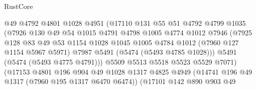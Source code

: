 \begin{lexlean}{RustCore}
\begin{coremodule}
                                @49
                                @4792
                                @4801
                                @1028
                                @4951
                                (@17110
                                  @131
                                  @55
                                  @51
                                  @4792
                                  @4799
                                  @1035
                                  (@7926
                                    @130
                                    @49
                                    @54
                                    @1015
                                    @4791
                                    @4798
                                    @1005
                                    @4774
                                    @1012
                                    @7946
                                    (@7925
                                      @128
                                      @83
                                      @49
                                      @53
                                      @1154
                                      @1028
                                      @1045
                                      @1005
                                      @4784
                                      @1012
                                      (@7960 @127 @1154 @5967 @5971)
                                      @7987
                                      @5491
                                      (@5474 (@5493 @4785 @1028)))
                                    @5491
                                    (@5474 (@5493 @4775 @4791)))
                                  @5509
                                  @5513
                                  @5518
                                  @5523
                                  @5529
                                  @7071)
                                (@17153
                                  @4801
                                  @196
                                  @904
                                  @49
                                  @1028
                                  @1317
                                  @4825
                                  @4949
                                  (@14741 @196 @49 @1317 (@7960 @195 @1317 @6470 @6474))
                                  (@17101
                                    @142
                                    @890
                                    @903
                                    @49

\end{coremodule}
\end{lexlean}
